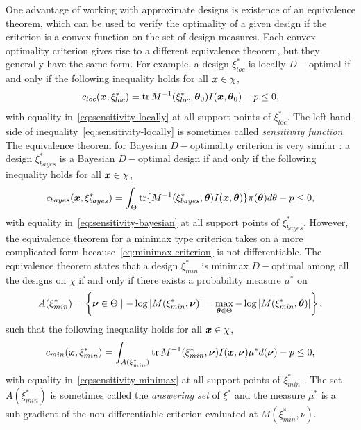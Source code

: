 One advantage of working with approximate designs is existence of an  equivalence theorem, which can be used to verify the optimality of a given design if the criterion is a convex function on the set of design measures. 
Each convex optimality criterion gives rise to a different equivalence theorem, but they generally have the same form.
For example, a design $\xi_{loc}^*$ is locally $D-$optimal  if and only if the following inequality holds for all $\boldsymbol{x} \in \chi$,
\begin{equation}
\label{eq:sensitivity-locally}
c_{loc}(\bx, \xi_{loc}^*) = \tr M^{-1}(\xi_{loc}^*, \btheta_{0})I(\bx, \btheta_{0}) - p \leq 0,
\end{equation}
with equality in~\eqref{eq:sensitivity-locally} at all support points of $\xi_{loc}^*$.
The left hand-side of  inequality~\eqref{eq:sensitivity-locally} is  sometimes called {\it sensitivity function}.
The equivalence theorem for Bayesian $D-$optimality criterion is very similar \citep{kiefer1959,chaloner1989}: a design $\xi_{bayes}^*$ is a Bayesian $D-$optimal design if and only if the following inequality holds for all $\boldsymbol{x} \in \chi$,
\begin{equation}
\label{eq:sensitivity-bayesian}
c_{bayes}(\boldsymbol{x}, \xi_{bayes}^*) = \int_{\Theta} \mbox{tr} \{ M^{-1}(\xi_{bayes}^*, \boldsymbol{\theta})I(\boldsymbol{x}, \boldsymbol{\theta})\}\pi(\boldsymbol{\theta}) d\theta-p \leq 0,
\end{equation}
with equality in~\eqref{eq:sensitivity-bayesian} at all support points of $\xi_{bayes}^*$. However, the  equivalence theorem for  a minimax type criterion  takes on a more complicated form because~\eqref{eq:minimax-criterion} is not differentiable. The equivalence theorem states that a design $\xi^*_{min}$ is minimax $D-$optimal among all the designs on $\chi$ if and only if there exists a probability measure $\mu^*$ on
\begin{equation}
\label{eq:A-set}
A(\xi_{min}^*) = \left\{\boldsymbol{\nu} \in \Theta \mid -\log|M(\xi_{min}^*, \boldsymbol{\nu})| = \max_{\boldsymbol{\theta} \in \Theta} -\log|M(\xi_{min}^*, \boldsymbol{\theta})| \right\},
\end{equation}
such that the following inequality holds for all $\boldsymbol{x} \in \chi$,
\begin{equation}
\label{eq:sensitivity-minimax}
c_{min}(\bx, \xi_{min}^*) = \int_{A(\xi_{min}^*)} \tr M^{-1}(\xi_{min}^*, \bnu) I(\bx, \bnu)\mu^* d(\bnu)-p \leq 0,
\end{equation}
with equality in~\eqref{eq:sensitivity-minimax} at all support points of $\xi_{min}^*$ \citep{wong1992, fedorov1980convex, king2000, berger2000}.
The set $A(\xi_{min}^*)$ is sometimes called the {\it answering set} of $\xi^*$ and the measure $\mu^*$ is a sub-gradient of the non-differentiable criterion evaluated at $M(\xi_{min}^*,\nu)$.
